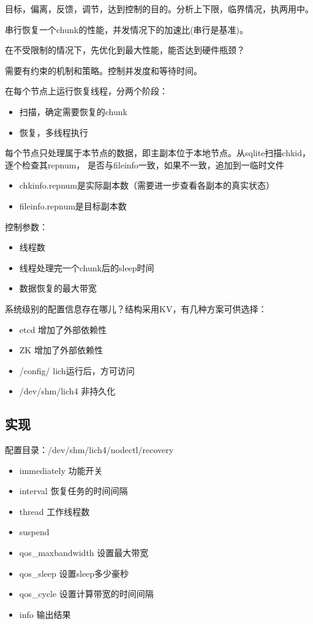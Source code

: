 目标，偏离，反馈，调节，达到控制的目的。分析上下限，临界情况，执两用中。

串行恢复一个chunk的性能，并发情况下的加速比(串行是基准)。

在不受限制的情况下，先优化到最大性能，能否达到硬件瓶颈？

需要有约束的机制和策略。控制并发度和等待时间。

在每个节点上运行恢复线程，分两个阶段：
\begin{itemize}
    \item 扫描，确定需要恢复的chunk
    \item 恢复，多线程执行
\end{itemize}

每个节点只处理属于本节点的数据，即主副本位于本地节点。从sqlite扫描chkid，逐个检查其repnum，
是否与fileinfo一致，如果不一致，追加到一临时文件
\begin{itemize}
    \item chkinfo.repnum是实际副本数（需要进一步查看各副本的真实状态）
    \item fileinfo.repnum是目标副本数
\end{itemize}

控制参数：
\begin{itemize}
    \item 线程数
    \item 线程处理完一个chunk后的sleep时间
    \item 数据恢复的最大带宽
\end{itemize}

系统级别的配置信息存在哪儿？结构采用KV，有几种方案可供选择：
\begin{itemize}
    \item etcd           增加了外部依赖性
    \item ZK             增加了外部依赖性
    \item /config/       lich运行后，方可访问
    \item /dev/shm/lich4 非持久化
\end{itemize}

\subsection{实现}

配置目录：/dev/shm/lich4/nodectl/recovery

\begin{itemize}
    \item immediately       功能开关
    \item interval          恢复任务的时间间隔
    \item thread            工作线程数
    \item suspend
    \item qos\_maxbandwidth 设置最大带宽
    \item qos\_sleep        设置sleep多少豪秒
    \item qos\_cycle        设置计算带宽的时间间隔
    \item info              输出结果
\end{itemize}

